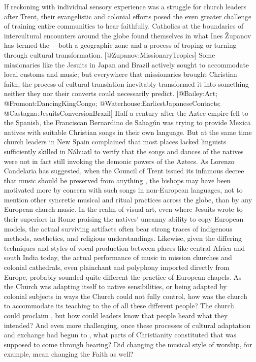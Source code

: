 If reckoning with individual sensory experience was a struggle for church leaders after Trent, their evangelistic and colonial efforts posed the even greater challenge of training entire communities to hear faithfully.
Catholics at the boundaries of intercultural encounters around the globe found themselves in what Ines Županov has termed the ---both a geographic zone and a process of troping or turning through cultural transformation.
[@Zupanov:MissionaryTropics]
Some missionaries like the Jesuits in Japan and Brazil actively sought to accommodate local customs and music; but everywhere that missionaries brought Christian faith, the process of cultural translation inevitably transformed it into something neither they nor their converts could necessarily predict.
[@Bailey:Art; @Fromont:DancingKingCongo; @Waterhouse:EarliestJapaneseContacts; @Castagna:JesuitsConversionBrazil]
Half a century after the Aztec empire fell to the Spanish, the Franciscan Bernardino de Sahagún was trying to provide Mexica natives with suitable Christian songs in their own language.
But at the same time church leaders in New Spain complained that most places lacked linguists sufficiently skilled in Náhuatl to verify that the songs and dances of the natives were not in fact still invoking the demonic powers of the Aztecs.
\Autocite[637]{Candelaria:Psalmodia}
As Lorenzo Candelaria has suggested, when the Council of Trent issued its infamous decree that music should be preserved from anything , the bishops may have been motivated more by concern with such songs in non-European languages, not to mention other syncretic musical and ritual practices across the globe, than by any European church music.
\Autocite[637--638]{Candelaria:Psalmodia}
In the realm of visual art, even where Jesuits wrote to their superiors in Rome praising the natives' uncanny ability to copy European models, the actual surviving artifacts often bear strong traces of indigenous methods, aesthetics, and religious understandings.
\Autocite[27--29, 34]{Bailey:Art}
Likewise, given the differing techniques and styles of vocal production between places like central Africa and south India today, the actual performance of music in mission churches and colonial cathedrals, even plainchant and polyphony imported directly from Europe, probably sounded quite different the practice of European chapels.
\Autocite[XXX]{Kendrick:Jeremiah} %
As the Church was adapting itself to native sensibilities, or being adapted by colonial subjects in ways the Church could not fully control, how was the church to accommodate its teaching to the  of all these different people?  The church could proclaim , but how could leaders know that people heard what they intended?  And even more challenging, once these processes of cultural adaptation and exchange had begun to , what parts of Christianity constituted  that was supposed to come through hearing?  Did changing the musical style of worship, for example, mean changing the Faith as well?
